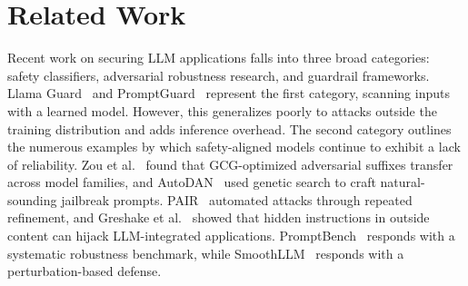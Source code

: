 \documentclass[runningheads]{llncs}
\begin{document}
\section{Related Work}\label{sec:related_wks}
Recent work on securing LLM applications falls into three broad categories: safety classifiers, adversarial robustness research, and guardrail frameworks. Llama Guard~\cite{llamaguard} and PromptGuard~\cite{promptguard} represent the first category, scanning inputs with a learned model. However, this generalizes poorly to attacks outside the training distribution and adds inference overhead. The second category outlines the numerous examples by which safety-aligned models continue to exhibit a lack of reliability. Zou et al.~\cite{zou2023universal} found that GCG-optimized adversarial suffixes transfer across model families, and AutoDAN~\cite{autodan} used genetic search to craft natural-sounding jailbreak prompts. PAIR~\cite{pair} automated attacks through repeated refinement, and Greshake et al.~\cite{greshake2023indirect} showed that hidden instructions in outside content can hijack LLM-integrated applications. PromptBench~\cite{promptbench} responds with a systematic robustness benchmark, while SmoothLLM~\cite{smoothllm} responds with a perturbation-based defense.
\end{document}
